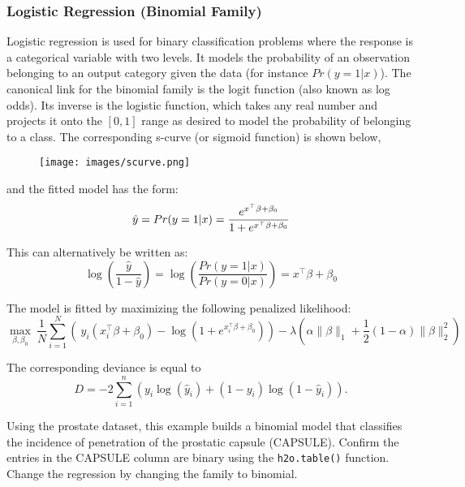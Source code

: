 \subsubsection{Logistic Regression (Binomial Family)}
Logistic regression is used for binary classification problems where the response is a categorical variable with two
levels. It models the probability of an observation belonging to an output category given the data (for instance $ Pr(y = 1|x)$).
The canonical link for the binomial family is the logit function (also known as log odds). Its inverse is the logistic function, which takes any real number and projects it onto the $[0,1]$ range as desired to model the probability of belonging to a class. The corresponding s-curve (or sigmoid function) is shown below,

\begin{figure}[h]
\centering
\texttt{[image: images/scurve.png]}
\end{figure}

and the fitted model has the form:
$$ \hat{y} = Pr(y = 1|x) = {e^{x^{\top}\beta + \beta_0} \over 1 + e^{x^{\top} \beta + \beta_0} }$$

This can alternatively be written as: 
$$  \log \left( \frac{\hat{y}}{ 1- \hat{y} } \right)  = \log \left(  \frac{Pr(y=1|x)}{Pr(y=0|x)}   \right) = x^{\top} \beta + \beta_0$$

The model is fitted by maximizing the following penalized likelihood: 
$$  \max_{\beta,\beta_0} \  \frac{1}{N} \sum_{i=1}^{N} \left( \ y_i (x_i^{\top}\beta  + \beta_0) - \log (1 + e^{x_i^{\top}\beta  + \beta_0} ) \right)  - \lambda \left( \alpha \|\beta \|_1 +  \frac{1}{2}(1- \alpha)  \| \beta \|_2^2 \right)$$

The corresponding deviance is equal to 
$$D = -2\sum_{i=1}^{n} \left(y_i \log(\hat{y}_i) + (1 - y_i)\log(1-\hat{y}_i)  \right).$$

\waterExampleInR

Using the prostate dataset, this example builds a binomial model that classifies the incidence of penetration of the prostatic
capsule (CAPSULE). Confirm the entries in the CAPSULE column are binary using the \texttt{h2o.table()}
function. Change the regression by changing the family to binomial.
\newpage


\waterExampleInPython



